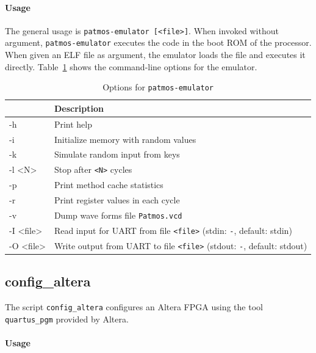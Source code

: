 \documentclass[a4paper,fontsize=10pt,twoside,DIV15,BCOR12mm,headinclude=true,footinclude=false,pagesize,bibtotoc]{scrbook}
\begin{document}
\paragraph{Usage} 

The general usage is \texttt{patmos-emulator [<file>]}. When invoked
without argument, \texttt{patmos-emulator} executes the code in the
boot ROM of the processor. When given an ELF file as argument, the
emulator loads the file and executes it
directly. Table~\ref{tab:emulopts} shows the command-line options for
the emulator.

\begin{table}
  \centering
  \caption{Options for \texttt{patmos-emulator}}
  \label{tab:emulopts}
  \begin{tabular}{>{\ttfamily}l<{}p{}}
    \toprule
    \multicolumn{1}{l}{Option} & Description \\
    \midrule
    -h            & Print help \\
    -i            & Initialize memory with random values \\
    -k            & Simulate random input from keys \\
    -l <N>        & Stop after \texttt{<N>} cycles \\
    -p            & Print method cache statistics \\
    -r            & Print register values in each cycle \\
    -v            & Dump wave forms file \texttt{Patmos.vcd} \\
    -I <file>     & Read input for UART from file \texttt{<file>} (stdin: \texttt{-}, default: stdin) \\
    -O <file>     & Write output from UART to file \texttt{<file>} (stdout: \texttt{-}, default: stdout) \\
    \bottomrule
  \end{tabular}
\end{table}

\subsection{config\_altera}

The script \texttt{config\_altera} configures an Altera FPGA using the
tool \texttt{quartus\_pgm} provided by Altera.

\paragraph{Usage}
\end{document}
